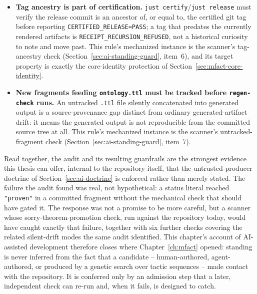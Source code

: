 \begin{itemize}
  \texttt{PROVEN} status rather than ship alongside it. This rule's
  mechanized instance is the scanner's correspondence-binding check
  (Section~\ref{sec:ai-standing-guard}, item~5), developed further in
  Chapter~\ref{ch:correspondence}.
\item \textbf{Tag ancestry is part of certification.}
  \texttt{just certify}/\texttt{just release} must verify the release
  commit is an ancestor of, or equal to, the certified git tag before
  reporting \texttt{CERTIFIED\_RELEASE=PASS}; a tag that predates the
  currently rendered artifacts is \texttt{RECEIPT\_RECURSION\_REFUSED},
  not a historical curiosity to note and move past. This rule's
  mechanized instance is the scanner's tag-ancestry check
  (Section~\ref{sec:ai-standing-guard}, item~6), and its target property
  is exactly the core-identity protection of
  Section~\ref{sec:mfact-core-identity}.
\item \textbf{New fragments feeding \texttt{ontology.ttl} must be
  tracked before \texttt{regen-check} runs.} An untracked \texttt{.ttl}
  file silently concatenated into generated output is a source-provenance
  gap distinct from ordinary generated-artifact drift: it means the
  generated output is not reproducible from the committed source tree at
  all. This rule's mechanized instance is the scanner's untracked-fragment
  check (Section~\ref{sec:ai-standing-guard}, item~7).
\end{itemize}

Read together, the audit and its resulting guardrails are the strongest
evidence this thesis can offer, internal to the repository itself, that
the untrusted-producer doctrine of Section~\ref{sec:ai-doctrine} is
enforced rather than merely stated. The failure the audit found was
real, not hypothetical: a status literal reached \texttt{"proven"} in a
committed fragment without the mechanical check that should have gated
it. The response was not a promise to be more careful, but a scanner
whose sorry-theorem-promotion check, run against the repository today,
would have caught exactly that failure, together with six further checks
covering the related silent-drift modes the same audit identified. This
chapter's account of AI-assisted development therefore closes where
Chapter~\ref{ch:mfact} opened: standing is never inferred from the fact
that a candidate -- human-authored, agent-authored, or produced by a
genetic search over tactic sequences -- made contact with the
repository. It is conferred only by an admission step that a later,
independent check can re-run and, when it fails, is designed to catch.

